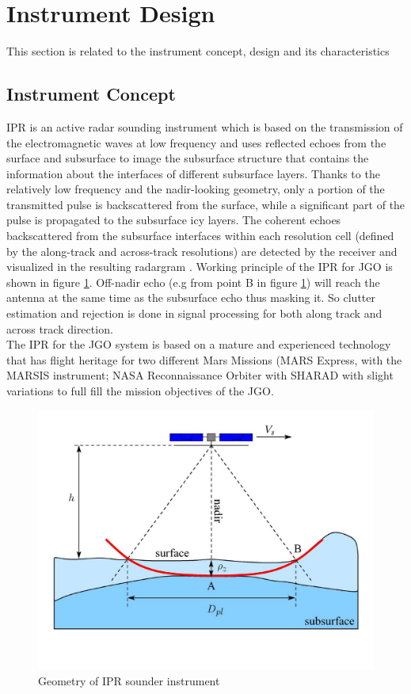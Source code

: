 \section{Instrument Design}
\label{IPR_design}
This section is related to the instrument concept, design and its characteristics 
\subsection{Instrument Concept}
\ac{IPR} is an active radar sounding instrument which is based on the transmission of the electromagnetic waves at low frequency and uses reflected echoes from the surface and subsurface to image the subsurface structure that contains the information about the interfaces of different subsurface layers. Thanks to the relatively low frequency and the nadir-looking geometry, only a portion of the transmitted pulse is backscattered from the surface, while a significant part of the pulse is propagated to the subsurface icy layers\cite{Gany_SRS}. The coherent echoes backscattered from the subsurface interfaces within each resolution cell (defined by the along-track and across-track resolutions) are detected by the receiver and visualized in the resulting radargram \cite{Gany_SRS}. Working principle of the \ac{IPR} for \ac{JGO} is shown in figure \ref{fig:IPR_concept}. Off-nadir echo (e.g from point B in figure \ref{fig:IPR_concept}) will reach the antenna at the same time as the subsurface echo thus masking it. So clutter estimation and rejection is done in signal processing for both along track and across track direction.\\
%
The \ac{IPR} for the \ac{JGO} system is based on a mature and experienced technology that has flight heritage for two different Mars Missions (MARS Express, with the \ac{MARSIS} instrument; NASA Reconnaissance Orbiter with \ac{SHARAD} with slight variations to full fill  the mission objectives of the \ac{JGO}.
%
\begin{figure}[bht]
\centering
\includegraphics[scale=0.5]{Figures/IPR_Concept.pdf}
\caption{Geometry of \ac{IPR} sounder instrument \cite{Gany_SRS}} 
\label{fig:IPR_concept}
\end{figure}
%
